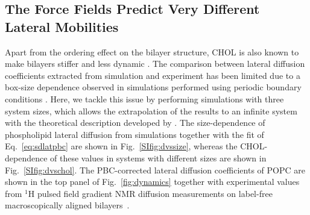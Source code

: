 \documentclass[journal=jctcce]{achemso}
\begin{document}
\subsection{The Force Fields Predict Very Different Lateral Mobilities}

Apart from the ordering effect on the bilayer structure, CHOL is also known to make bilayers stiffer and less dynamic \cite{rog2009ordering,filippov2003effect,filippov2003influence}. The comparison between lateral diffusion coefficients extracted from simulation and experiment has been limited due to a box-size dependence observed in simulations performed using periodic boundary conditions \cite{vogele2016divergent,vogele2018hydrodynamics,camley2015strong}. Here, we tackle this issue by performing simulations with three system sizes, which allows the extrapolation of the results to an infinite system with the theoretical description developed by \citeauthor{vogele2016divergent} \cite{vogele2016divergent,vogele2018hydrodynamics}. The size-dependence of phospholipid lateral diffusion from simulations together with the fit of Eq.~\eqref{eq:sdlatpbc} are shown in Fig.~\ref{SIfig:dvssize}, whereas the CHOL-dependence of these values in systems with different sizes are shown in Fig.~\ref{SIfig:dvschol}. The PBC-corrected lateral diffusion coefficients of POPC are shown in the top panel of Fig.~\ref{fig:dynamics} together with experimental values from $^1$H pulsed field gradient NMR diffusion measurements on label-free macroscopically aligned bilayers~\cite{filippov2003influence,filippov2003effect}. 
\end{document}
